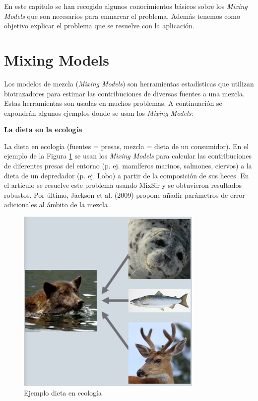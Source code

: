 
En este capitulo se han recogido algunos conocimientos básicos sobre los \emph{Mixing Models} que son necesarios para enmarcar el problema. Además tenemos como objetivo explicar el problema que se resuelve con la aplicación.

\section{Mixing Models}

Los modelos de mezcla (\emph{Mixing Models}) son herramientas estadísticas que utilizan biotrazadores para estimar las contribuciones de diversas fuentes a una mezcla.
Estas herramientas son usadas en muchos problemas. A continuación se expondrán algunos ejemplos donde se usan los \emph{Mixing Models}:


\textbf{La dieta en la ecología}

La dieta en ecología  (fuentes = presas, mezcla = dieta de un consumidor). En el ejemplo de la Figura \ref{fig:preyDiet} se usan los \emph{Mixing Models} para calcular las contribuciones de diferentes presas del entorno (p. ej. mamíferos marinos, salmones, ciervos) a la dieta de un depredador (p. ej. Lobo) a partir de la composición de sus heces. En el articulo \cite{improveBayes2009} se resuelve este problema usando MixSir y se obtuvieron resultados robustos. Por último, Jackson et al. (2009) propone añadir parámetros de error adicionales al ámbito de la mezcla .

\begin{figure}[h!] 
\centering
    \includegraphics[width=0.8\textwidth]{img/preyDiet.PNG}
\caption{Ejemplo dieta en ecología }
\label{fig:preyDiet}
\end{figure}

